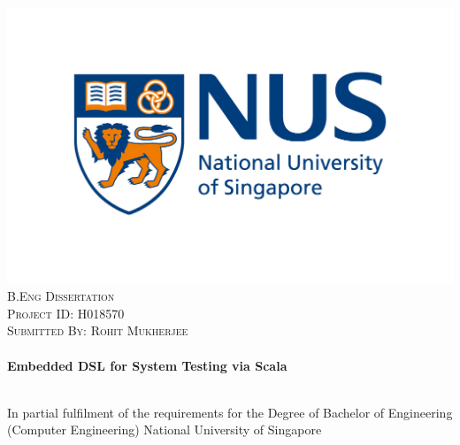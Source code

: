 \begin{titlepage}
\begin{center}

\includegraphics[width=1\textwidth]{figures/nus_logo.jpg}\\[1cm]

\textsc{\Large B.Eng Dissertation}\\[0.3cm]
\textsc{\Large Project ID: H018570}\\[0.3cm]
\textsc{\Large Submitted By: Rohit Mukherjee}\\[0.3cm]

\HRule \\[0.4cm]
{ \huge \bfseries Embedded DSL for System Testing via Scala \\[0.4cm] }

\HRule \\[1.0cm]


\vspace{8 mm}
In partial fulfilment of the requirements for the Degree of Bachelor of Engineering (Computer Engineering) National University of Singapore 
\bigskip

\end{center}
\end{titlepage}